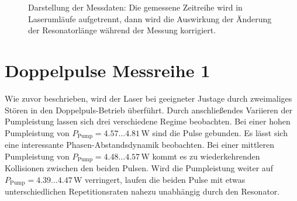\documentclass[bachelor,       %
               twoside,        %
               BCOR10mm,       %
               liststotoc,nomtotoc,bibtotoc, %
               english,ngerman, %
               final,          %
               ]{GAUBM}
\begin{document}
\begin{figure}[!htb]
   \hfill
   \caption{Darstellung der Messdaten: Die gemessene Zeitreihe wird in Laserumläufe aufgetrennt, dann wird die Auswirkung der Änderung der Resonatorlänge während der Messung korrigiert.}
   \label{fig:MessdatenDarstellung}
\end{figure}

\section{Doppelpulse Messreihe 1}
Wie zuvor beschrieben, wird der Laser bei geeigneter Justage durch zweimaliges Stören in den Doppelpuls-Betrieb überführt.
Durch anschließendes Variieren der Pumpleistung lassen sich drei verschiedene Regime beobachten.
Bei einer hohen Pumpleistung von $P_\text{Pump}=4.57\dots 4.81\,$W sind die Pulse gebunden.
Es lässt sich eine interessante Phasen-Abstandsdynamik beobachten.
Bei einer mittleren Pumpleistung von $P_\text{Pump}=4.48\dots 4.57\,$W kommt es zu wiederkehrenden Kollisionen zwischen den beiden Pulsen.
Wird die Pumpleistung weiter auf $P_\text{Pump}=4.39\dots 4.47\,$W verringert, laufen die beiden Pulse mit etwas unterschiedlichen Repetitionsraten nahezu unabhängig durch den Resonator.
\end{document}
